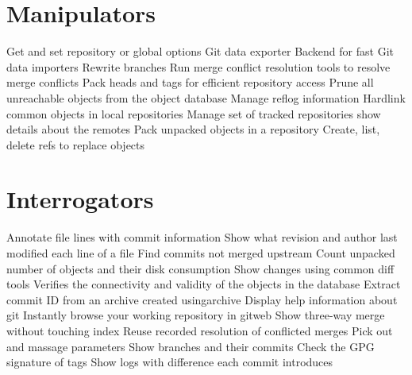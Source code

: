 \section{Manipulators}{}
	{Get and set repository or global options}
	{Git data exporter}
	{Backend for fast Git data importers}
	{Rewrite branches}
	{Run merge conflict resolution tools to resolve merge conflicts}
	{Pack heads and tags for efficient repository access}
	{Prune all unreachable objects from the object database}
	{Manage reflog information}
	{Hardlink common objects in local repositories}
	{Manage set of tracked repositories}
	{show details about the remotes}
	{Pack unpacked objects in a repository}
	{Create, list, delete refs to replace objects}

\section{Interrogators}{}
	{Annotate file lines with commit information}
	{\emergencystretch=5pt Show what revision and author last modified each line of a file}
	{Find commits not merged upstream}
	{Count unpacked number of objects and their disk consumption}
	{Show changes using common diff tools}
	{Verifies the connectivity and validity of the objects in the database}
	{Extract commit ID from an archive created usingarchive}
	{Display help information about git}
	{Instantly browse your working repository in gitweb}
	{Show three-way merge without touching index}
	{Reuse recorded resolution of conflicted merges}
	{Pick out and massage parameters}
	{Show branches and their commits}
	{Check the GPG signature of tags}
	{Show logs with difference each commit introduces}

